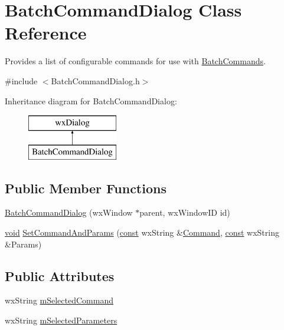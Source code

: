 \hypertarget{class_batch_command_dialog}{}\section{Batch\+Command\+Dialog Class Reference}
\label{class_batch_command_dialog}


Provides a list of configurable commands for use with \hyperlink{class_batch_commands}{Batch\+Commands}.  




{\ttfamily \#include $<$Batch\+Command\+Dialog.\+h$>$}

Inheritance diagram for Batch\+Command\+Dialog\+:\begin{figure}[H]
\begin{center}
\leavevmode
\includegraphics[height=2.000000cm]{class_batch_command_dialog}
\end{center}
\end{figure}
\subsection*{Public Member Functions}
\begin{DoxyCompactItemize}
\item 
\hyperlink{class_batch_command_dialog_a91ffd7bb9ef2d3792453b533b4cea898}{Batch\+Command\+Dialog} (wx\+Window $\ast$parent, wx\+Window\+ID id)
\item 
\hyperlink{sound_8c_ae35f5844602719cf66324f4de2a658b3}{void} \hyperlink{class_batch_command_dialog_a80166d9626f9ae578d784eccc67ea915}{Set\+Command\+And\+Params} (\hyperlink{getopt1_8c_a2c212835823e3c54a8ab6d95c652660e}{const} wx\+String \&\hyperlink{class_command}{Command}, \hyperlink{getopt1_8c_a2c212835823e3c54a8ab6d95c652660e}{const} wx\+String \&Params)
\end{DoxyCompactItemize}
\subsection*{Public Attributes}
\begin{DoxyCompactItemize}
\item 
wx\+String \hyperlink{class_batch_command_dialog_ae187a0c96c75a82df6c78389a8bf99ba}{m\+Selected\+Command}
\item 
wx\+String \hyperlink{class_batch_command_dialog_afa5d93734ae60d64a6fbf65f917f05da}{m\+Selected\+Parameters}
\end{DoxyCompactItemize}


